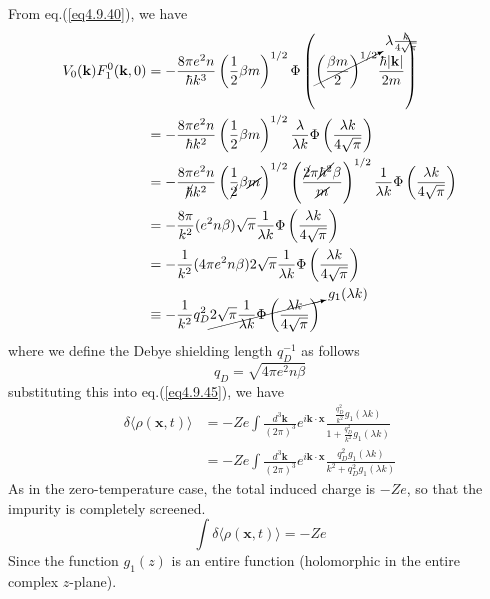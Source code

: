 From eq.(\ref{eq4.9.40}), we have
\begin{equation}
\begin{aligned}
V_0(\mathbf k)F^0_1(\mathbf k,0)&=-\frac{8\pi e^2n}{\hbar k^3} \left( \frac{1}{2}\beta m \right)^{1/2} \Phi\left( \cancelto{\lambda\frac{k}{4\sqrt \pi}}{\left( \frac{\beta m}{2} \right)^{1/2}}  \frac{\hbar|\mathbf k|}{2m}\right)\\
&=-\frac{8\pi e^2n}{\hbar k^2} \left( \frac{1}{2}\beta m \right)^{1/2} \frac{\lambda}{\lambda k}\Phi\left( \frac{\lambda k}{4\sqrt\pi} \right)\\
&=-\frac{8\pi e^2n}{\cancel{\hbar} k^2} \left( \frac{1}{\cancel{2}}\beta \cancel{m} \right)^{1/2} \left( \frac{\cancel{2}\pi \cancel{\hbar^2} \beta}{\cancel{m}} \right)^{1/2} \frac{1}{\lambda k} \Phi\left( \frac{\lambda k}{4\sqrt\pi} \right)\\
&=-\frac{8\pi}{k^2}(e^2n\beta)\sqrt\pi\frac{1}{\lambda k}\Phi\left( \frac{\lambda k}{4\sqrt\pi} \right)\\
&=-\frac{1}{k^2}(4\pi e^2n\beta)2\sqrt\pi\frac{1}{\lambda k}\Phi\left( \frac{\lambda k}{4\sqrt\pi} \right)\\
&\equiv -\frac{1}{k^2}q_D^2\cancelto{g_1(\lambda k)}{2\sqrt\pi\frac{1}{\lambda k}\Phi\left( \frac{\lambda k}{4\sqrt\pi} \right)}
\end{aligned}
\end{equation}
where we define the Debye shielding length $q_D^{-1}$ as follows
\begin{equation}
q_D=\sqrt{4\pi e^2 n\beta}
\end{equation}
substituting this into eq.(\ref{eq4.9.45}), we have
\begin{equation}
\begin{aligned}
\delta\langle\rho(\mathbf x,t)\rangle&=-Ze\int \frac{d^3\mathbf k}{(2\pi)^3}e^{i\mathbf k\cdot\mathbf x}\frac{\frac{q_D^2}{k^2}g_1(\lambda k)}{1+\frac{q_D^2}{k^2}g_1(\lambda k)}\\
&=-Ze\int \frac{d^3\mathbf k}{(2\pi)^3}e^{i\mathbf k\cdot\mathbf x}\frac{q_D^2 g_1(\lambda k)}{k^2+q_D^2 g_1(\lambda k)}
\end{aligned}
\end{equation}
 As in the zero-temperature case, the total induced charge is $-Ze$, so that the impurity is completely screened.\\
\begin{equation}
\int \delta\langle\rho(\mathbf x,t)\rangle=-Ze
\end{equation}
Since the function $g_1(z)$ is an entire function (holomorphic in the entire complex $z$-plane).
